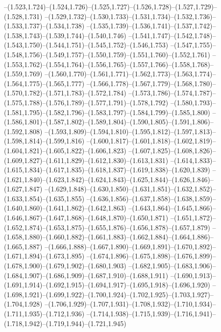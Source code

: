   --(1.523,1.724)--(1.524,1.726)--(1.525,1.727)--(1.526,1.728)--(1.527,1.729)--(1.528,1.731)%
  --(1.529,1.732)--(1.530,1.733)--(1.531,1.734)--(1.532,1.736)--(1.533,1.737)--(1.534,1.738)%
  --(1.535,1.739)--(1.536,1.741)--(1.537,1.742)--(1.538,1.743)--(1.539,1.744)--(1.540,1.746)%
  --(1.541,1.747)--(1.542,1.748)--(1.543,1.750)--(1.544,1.751)--(1.545,1.752)--(1.546,1.753)%
  --(1.547,1.755)--(1.548,1.756)--(1.549,1.757)--(1.550,1.759)--(1.551,1.760)--(1.552,1.761)%
  --(1.553,1.762)--(1.554,1.764)--(1.556,1.765)--(1.557,1.766)--(1.558,1.768)--(1.559,1.769)%
  --(1.560,1.770)--(1.561,1.771)--(1.562,1.773)--(1.563,1.774)--(1.564,1.775)--(1.565,1.777)%
  --(1.566,1.778)--(1.567,1.779)--(1.568,1.780)--(1.570,1.782)--(1.571,1.783)--(1.572,1.784)%
  --(1.573,1.786)--(1.574,1.787)--(1.575,1.788)--(1.576,1.789)--(1.577,1.791)--(1.578,1.792)%
  --(1.580,1.793)--(1.581,1.795)--(1.582,1.796)--(1.583,1.797)--(1.584,1.799)--(1.585,1.800)%
  --(1.586,1.801)--(1.587,1.802)--(1.589,1.804)--(1.590,1.805)--(1.591,1.806)--(1.592,1.808)%
  --(1.593,1.809)--(1.594,1.810)--(1.595,1.812)--(1.597,1.813)--(1.598,1.814)--(1.599,1.816)%
  --(1.600,1.817)--(1.601,1.818)--(1.602,1.819)--(1.604,1.821)--(1.605,1.822)--(1.606,1.823)%
  --(1.607,1.825)--(1.608,1.826)--(1.609,1.827)--(1.611,1.829)--(1.612,1.830)--(1.613,1.831)%
  --(1.614,1.833)--(1.615,1.834)--(1.617,1.835)--(1.618,1.837)--(1.619,1.838)--(1.620,1.839)%
  --(1.621,1.840)--(1.623,1.842)--(1.624,1.843)--(1.625,1.844)--(1.626,1.846)--(1.627,1.847)%
  --(1.629,1.848)--(1.630,1.850)--(1.631,1.851)--(1.632,1.852)--(1.633,1.854)--(1.635,1.855)%
  --(1.636,1.856)--(1.637,1.858)--(1.638,1.859)--(1.640,1.860)--(1.641,1.862)--(1.642,1.863)%
  --(1.643,1.864)--(1.645,1.866)--(1.646,1.867)--(1.647,1.868)--(1.648,1.870)--(1.650,1.871)%
  --(1.651,1.872)--(1.652,1.874)--(1.653,1.875)--(1.655,1.876)--(1.656,1.878)--(1.657,1.879)%
  --(1.658,1.880)--(1.660,1.882)--(1.661,1.883)--(1.662,1.884)--(1.664,1.886)--(1.665,1.887)%
  --(1.666,1.888)--(1.667,1.890)--(1.669,1.891)--(1.670,1.892)--(1.671,1.894)--(1.673,1.895)%
  --(1.674,1.896)--(1.675,1.898)--(1.676,1.899)--(1.678,1.900)--(1.679,1.902)--(1.680,1.903)%
  --(1.682,1.905)--(1.683,1.906)--(1.684,1.907)--(1.686,1.909)--(1.687,1.910)--(1.688,1.911)%
  --(1.690,1.913)--(1.691,1.914)--(1.692,1.915)--(1.694,1.917)--(1.695,1.918)--(1.696,1.920)%
  --(1.698,1.921)--(1.699,1.922)--(1.700,1.924)--(1.702,1.925)--(1.703,1.927)--(1.704,1.928)%
  --(1.706,1.929)--(1.707,1.931)--(1.708,1.932)--(1.710,1.934)--(1.711,1.935)--(1.712,1.936)%
  --(1.714,1.938)--(1.715,1.939)--(1.716,1.941)--(1.718,1.942)--(1.719,1.944)--(1.721,1.945)%
